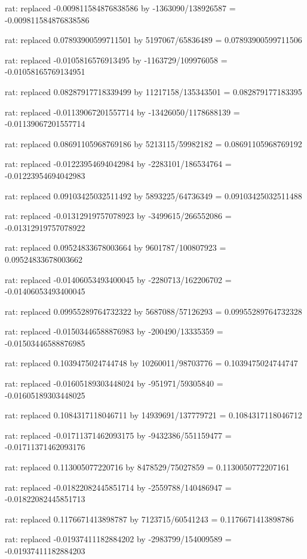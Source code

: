 \documentclass[a4paper,10pt]{article}
\begin{document}
\begin{eulernotebook}
\begin{eulercomment}
\begin{eulercomment}
\begin{eulercomment}
\begin{eulercomment}
\begin{eulercomment}
\begin{eulercomment}
\begin{eulercomment}
\begin{eulercomment}
\begin{eulercomment}
\begin{eulercomment}
\begin{eulercomment}
\begin{eulercomment}
\begin{eulercomment}
\begin{eulercomment}
\begin{eulercomment}
\begin{eulercomment}
\begin{euleroutput}
  rat: replaced -0.009811584876838586 by -1363090/138926587 = -0.009811584876838586
  
  rat: replaced 0.07893900599711501 by 5197067/65836489 = 0.07893900599711506
  
  rat: replaced -0.0105816576913495 by -1163729/109976058 = -0.01058165769134951
  
  rat: replaced 0.08287917718339499 by 11217158/135343501 = 0.082879177183395
  
  rat: replaced -0.01139067201557714 by -13426050/1178688139 = -0.01139067201557714
  
  rat: replaced 0.08691105968769186 by 5213115/59982182 = 0.08691105968769192
  
  rat: replaced -0.01223954694042984 by -2283101/186534764 = -0.01223954694042983
  
  rat: replaced 0.09103425032511492 by 5893225/64736349 = 0.09103425032511488
  
  rat: replaced -0.01312919757078923 by -3499615/266552086 = -0.01312919757078922
  
  rat: replaced 0.09524833678003664 by 9601787/100807923 = 0.09524833678003662
  
  rat: replaced -0.01406053493400045 by -2280713/162206702 = -0.01406053493400045
  
  rat: replaced 0.09955289764732322 by 5687088/57126293 = 0.09955289764732328
  
  rat: replaced -0.01503446588876983 by -200490/13335359 = -0.01503446588876985
  
  rat: replaced 0.1039475024744748 by 10260011/98703776 = 0.1039475024744747
  
  rat: replaced -0.01605189303448024 by -951971/59305840 = -0.01605189303448025
  
  rat: replaced 0.1084317118046711 by 14939691/137779721 = 0.1084317118046712
  
  rat: replaced -0.01711371462093175 by -9432386/551159477 = -0.01711371462093176
  
  rat: replaced 0.113005077220716 by 8478529/75027859 = 0.1130050772207161
  
  rat: replaced -0.01822082445851714 by -2559788/140486947 = -0.01822082445851713
  
  rat: replaced 0.1176671413898787 by 7123715/60541243 = 0.1176671413898786
  
  rat: replaced -0.01937411182884202 by -2983799/154009589 = -0.01937411182884203
  

\end{euleroutput}
\end{eulercomment}
\end{eulercomment}
\end{eulercomment}
\end{eulercomment}
\end{eulercomment}
\end{eulercomment}
\end{eulercomment}
\end{eulercomment}
\end{eulercomment}
\end{eulercomment}
\end{eulercomment}
\end{eulercomment}
\end{eulercomment}
\end{eulercomment}
\end{eulercomment}
\end{eulercomment}
\end{eulernotebook}
\end{document}
